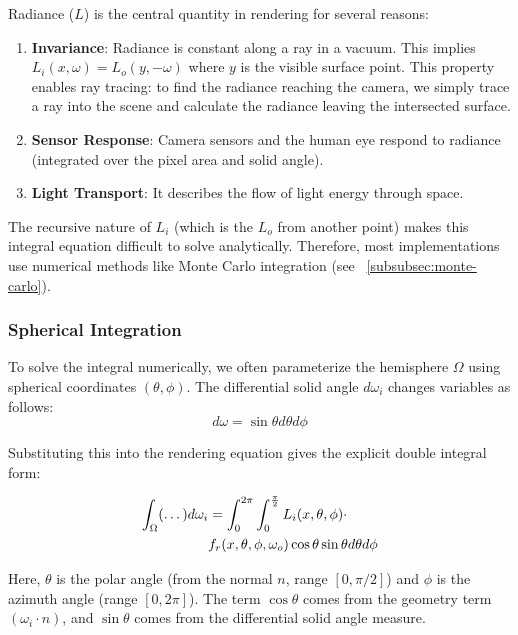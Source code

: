 Radiance ($L$) is the central quantity in rendering for several reasons:
\begin{enumerate}
    \item \textbf{Invariance}: Radiance is constant along a ray in a vacuum.
    This implies $L_i(x, \omega) = L_o(y, -\omega)$ where $y$ is the visible surface point.
    This property enables ray tracing: to find the radiance reaching the camera,
    we simply trace a ray into the scene and calculate the radiance leaving the intersected surface.
    \item \textbf{Sensor Response}: Camera sensors and the human eye respond to radiance
    (integrated over the pixel area and solid angle).
    \item \textbf{Light Transport}: It describes the flow of light energy through space.
\end{enumerate}

The recursive nature of $L_i$ (which is the $L_o$ from another point)
makes this integral equation difficult to solve analytically.
Therefore, most implementations use numerical methods like Monte Carlo integration (see ~\ref{subsubsec:monte-carlo}).

\subsubsection{Spherical Integration}

To solve the integral numerically, we often parameterize the hemisphere $\Omega$
using spherical coordinates $(\theta, \phi)$.
The differential solid angle $d\omega_i$ changes variables as follows:
\begin{equation}
    d\omega = \sin\theta d\theta d\phi\label{eq:omega-cov}
\end{equation}

Substituting this into the rendering equation gives the explicit double integral form:

\begin{align}
    \int_{\Omega} (\dots) d\omega_i &= \int_{0}^{2\pi} \int_{0}^{\frac{\pi}{2}} L_i(x, \theta, \phi) \cdot \notag \\
    & f_r(x, \theta, \phi, \omega_o) \cos\theta \sin\theta d\theta d\phi
\end{align}

Here, $\theta$ is the polar angle (from the normal $n$, range $[0, \pi/2]$)
and $\phi$ is the azimuth angle (range $[0, 2\pi]$).
The term $\cos\theta$ comes from the geometry term $(\omega_i \cdot n)$,
and $\sin\theta$ comes from the differential solid angle measure.

